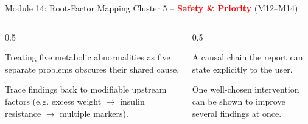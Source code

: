 \documentclass[9pt,aspectratio=169]{beamer}
\begin{document}
\begin{frame}{Module 14: Root-Factor Mapping}
\textcolor{black!55}{\scriptsize Cluster 5 -- \textcolor{red}{\textbf{Safety \& Priority}} (M12--M14)}\\[2pt]
\begin{columns}[T,onlytextwidth]
\begin{column}{0.5\textwidth}
\begin{tcolorbox}[colback=blue!7,colframe=blue!55!black,title=\textbf{Motivation},boxrule=0.6pt,arc=1mm,left=5pt,right=5pt,top=3pt,bottom=3pt,fonttitle=\small]
\footnotesize Treating five metabolic abnormalities as five separate problems obscures their shared cause.
\end{tcolorbox}
\vspace{5pt}
\begin{tcolorbox}[colback=teal!7,colframe=teal!55!black,title=\textbf{Method},boxrule=0.6pt,arc=1mm,left=5pt,right=5pt,top=3pt,bottom=3pt,fonttitle=\small]
\footnotesize Trace findings back to modifiable upstream factors (e.g. excess weight $\to$ insulin resistance $\to$ multiple markers).
\end{tcolorbox}
\end{column}
\begin{column}{0.5\textwidth}
\begin{tcolorbox}[colback=green!8,colframe=green!45!black,title=\textbf{Result},boxrule=0.6pt,arc=1mm,left=5pt,right=5pt,top=3pt,bottom=3pt,fonttitle=\small]
\footnotesize A causal chain the report can state explicitly to the user.
\end{tcolorbox}
\vspace{5pt}
\begin{tcolorbox}[colback=orange!10,colframe=orange!65!black,title=\textbf{Conclusion},boxrule=0.6pt,arc=1mm,left=5pt,right=5pt,top=3pt,bottom=3pt,fonttitle=\small]
\footnotesize One well-chosen intervention can be shown to improve several findings at once.
\end{tcolorbox}
\end{column}
\end{columns}
\end{frame}
\end{document}
